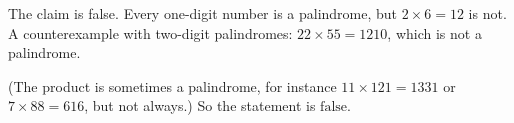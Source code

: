 The claim is false. Every one-digit number is a palindrome, but $2\times6=12$ is not. A counterexample with two-digit palindromes: $22\times55=1210$, which is not a palindrome.

(The product is sometimes a palindrome, for instance $11\times121=1331$ or $7\times88=616$, but not always.) So the statement is $\boxed{\text{false}}$.
